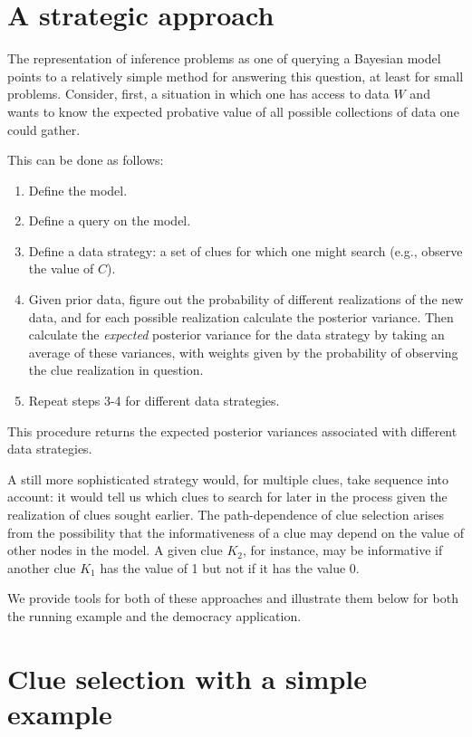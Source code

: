 \documentclass[12pt,]{book}
\providecommand{\tightlist}{%
  \setlength{\itemsep}{0pt}\setlength{\parskip}{0pt}}
\begin{document}
\hypertarget{a-strategic-approach}{%
\section{A strategic approach}\label{a-strategic-approach}}

The representation of inference problems as one of querying a Bayesian model points to a relatively simple method for answering this question, at least for small problems. Consider, first, a situation in which one has access to data \(W\) and wants to know the expected probative value of all possible collections of data one could gather.

This can be done as follows:

\begin{enumerate}
\def\labelenumi{\arabic{enumi}.}
\tightlist
\item
  Define the model.
\item
  Define a query on the model.
\item
  Define a data strategy: a set of clues for which one might search (e.g., observe the value of \(C\)).
\item
  Given prior data, figure out the probability of different realizations of the new data, and for each possible realization calculate the posterior variance. Then calculate the \emph{expected} posterior variance for the data strategy by taking an average of these variances, with weights given by the probability of observing the clue realization in question.
\item
  Repeat steps 3-4 for different data strategies.
\end{enumerate}

This procedure returns the expected posterior variances associated with different data strategies.

A still more sophisticated strategy would, for multiple clues, take sequence into account: it would tell us which clues to search for later in the process given the realization of clues sought earlier. The path-dependence of clue selection arises from the possibility that the informativeness of a clue may depend on the value of other nodes in the model. A given clue \(K_2\), for instance, may be informative if another clue \(K_1\) has the value of 1 but not if it has the value 0.

We provide tools for both of these approaches and illustrate them below for both the running example and the democracy application.

\hypertarget{clue-selection-with-a-simple-example}{%
\section{Clue selection with a simple example}\label{clue-selection-with-a-simple-example}}
\end{document}

